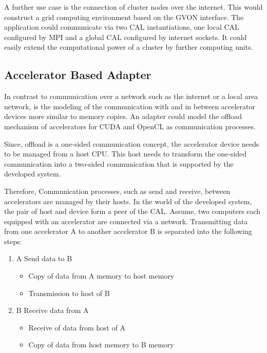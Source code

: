A further use case is the connection of cluster nodes over the
internet. This would construct a grid computing environment based
on the GVON interface. The application could communicate via two
CAL instantiations, one local CAL configured by MPI and a global
CAL configured by internet sockets.  It could easily extend the
computational power of a cluster by further computing
units.

\subsection*{Accelerator Based Adapter}

In contrast to communication over a network such as the internet
or a local area network, is the modeling of the communication with
and in between accelerator devices more similar to memory copies.
An adapter could model the offload mechanism of accelerators for
CUDA and OpenCL as communication processes.

Since, offload is a one-sided communication concept, the
accelerator device needs to be managed from a host CPU. This host
needs to transform the one-sided communication into a two-sided
communication that is supported by the developed system.

Therefore, Communication processes, such as send and receive,
between accelerators are managed by their hosts. In the world of the
developed system, the pair of host and device form a peer of the
CAL. Assume, two computers each equipped with an accelerator are
connected via a network. Transmitting data from one accelerator A to
another accelerator B is separated into the following steps:

\begin{enumerate}
\item A Send data to B
  \begin{itemize}
  \item Copy of data from A memory to host memory
  \item Transmission to host of B
  \end{itemize}
\item B Receive data from A
  \begin{itemize}
  \item Receive of data from host of A
  \item Copy of data from host memory to B memory
  \end{itemize}
\end{enumerate}

